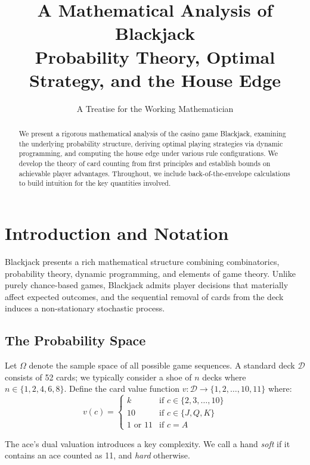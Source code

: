 \documentclass[11pt,a4paper]{article}
\title{\textbf{A Mathematical Analysis of Blackjack}\\[0.5em]
\large Probability Theory, Optimal Strategy, and the House Edge}
\author{A Treatise for the Working Mathematician}
\date{}
\theoremstyle{definition}
\begin{document}
\maketitle

\begin{abstract}
We present a rigorous mathematical analysis of the casino game Blackjack, examining the underlying probability structure, deriving optimal playing strategies via dynamic programming, and computing the house edge under various rule configurations. We develop the theory of card counting from first principles and establish bounds on achievable player advantages. Throughout, we include back-of-the-envelope calculations to build intuition for the key quantities involved.
\end{abstract}

\section{Introduction and Notation}

Blackjack presents a rich mathematical structure combining combinatorics, probability theory, dynamic programming, and elements of game theory. Unlike purely chance-based games, Blackjack admits player decisions that materially affect expected outcomes, and the sequential removal of cards from the deck induces a non-stationary stochastic process.

\subsection{The Probability Space}

Let $\Omega$ denote the sample space of all possible game sequences. A standard deck $\mathcal{D}$ consists of 52 cards; we typically consider a shoe of $n$ decks where $n \in \{1, 2, 4, 6, 8\}$. Define the card value function $v: \mathcal{D} \to \{1, 2, \ldots, 10, 11\}$ where:
\begin{equation}
v(c) = \begin{cases}
k & \text{if } c \in \{2, 3, \ldots, 10\} \\
10 & \text{if } c \in \{J, Q, K\} \\
1 \text{ or } 11 & \text{if } c = A
\end{cases}
\end{equation}

The ace's dual valuation introduces a key complexity. We call a hand \textit{soft} if it contains an ace counted as 11, and \textit{hard} otherwise.
\end{document}
